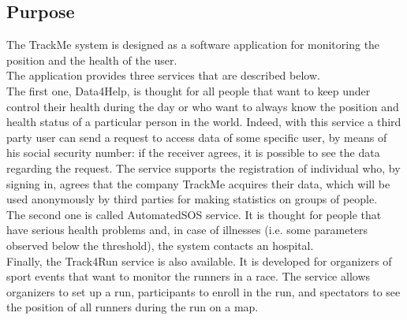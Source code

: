 \subsection{Purpose}
\par
The TrackMe system is designed as a software application for monitoring the position and the health of the user. \\
The application provides three services that are described below. \\
The first one, Data4Help, is thought for all people that want to keep under control their health during the day or who want to always know the position and health status of a particular person in the world. Indeed, with this service a third party user can send a request to access data of some specific user, by means of his social security number: if the receiver agrees, it is possible to see the data regarding the request. The service supports the registration of individual who, by signing in, agrees that the company TrackMe acquires their data, which will be used anonymously by third parties for making statistics on groups of people. \\
The second one is called AutomatedSOS service. It is thought for people that have serious health problems and, in case of illnesses (i.e. some parameters observed below the threshold), the system contacts an hospital. \\
Finally, the Track4Run service is also available. 
It is developed for organizers of sport events that want to monitor the runners in a race. The service allows organizers to set up a run, participants to enroll in the run, and spectators to see the position of all runners during the run on a map. \\

